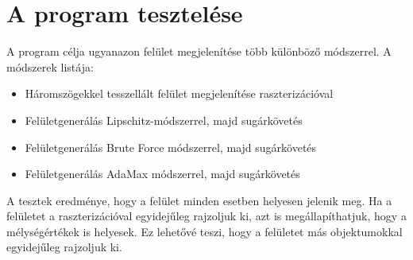 \section{A program tesztelése}

A program célja ugyanazon felület megjelenítése több különböző módszerrel. A módszerek listája: 
\begin{itemize}
	\item Háromszögekkel tesszellált felület megjelenítése raszterizációval
	\item Felületgenerálás Lipschitz-módszerrel, majd sugárkövetés
	\item Felületgenerálás Brute Force módszerrel, majd sugárkövetés
	\item Felületgenerálás AdaMax módszerrel, majd sugárkövetés
\end{itemize}
A tesztek eredménye, hogy a felület minden esetben helyesen jelenik meg. Ha a felületet a raszterizációval egyidejűleg rajzoljuk ki, azt is megállapíthatjuk, hogy a mélységértékek is helyesek. Ez lehetővé teszi, hogy a felületet más objektumokkal egyidejűleg rajzoljuk ki.





